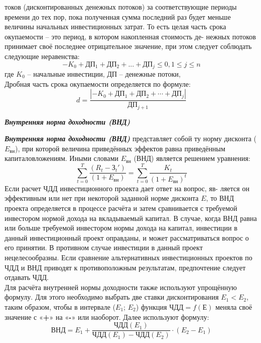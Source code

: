 \documentclass[a4paper,12pt]{article}
\begin{document}
токов (дисконтированных денежных потоков) за соответствующие периоды времени до тех пор, пока полученная сумма последний раз будет
меньше величины начальных инвестиционных затрат. То есть целая часть
срока окупаемости – это период, в котором накопленная стоимость де-
нежных потоков принимает своё последнее отрицательное значение, при
этом следует соблюдать следующие неравенства:
\begin{equation}
− K_0  + ДП_1 + ДП_2  + ... + ДП_j  \le 0 , 1 \le j \le n 
\end{equation}
где $K_0$ – начальные инвестиции, ДП – денежные потоки,\\
Дробная часть срока окупаемости определяется по формуле:
\begin{equation}
	d = \frac{|− K_0 + ДП_1 + ДП_2 + \cdots + ДП_j|}{ДП_{j+1}}
\end{equation}
\begin{center}
	\textbf{\textit{Внутренняя норма доходности (ВНД)}}
\end{center}
\textbf{\textit{Внутренняя норма доходности (ВНД)}} представляет собой ту норму дисконта (${E_{вн}}$), при которой величина приведённых эффектов равна
приведённым капиталовложениям. Иными словами ${E_{вн}}$ (ВНД) является
решением уравнения:
\begin{equation}
	\sum_{t=0}^ T \frac{(R_t - {З_t} \prime)}{(1+E_{вн})} = \sum_{t=0}^ T \frac{K_t}{(1+E_{вн})^t}
\end{equation}
Если расчет ЧДД инвестиционного проекта дает ответ на вопрос, яв-
ляется он эффективным или нет при некоторой заданной норме дисконта
${E}$, то ВНД проекта определяется в процессе расчёта и затем сравнивается
с требуемой инвестором нормой дохода на вкладываемый капитал. В случае, когда ВНД равна или больше требуемой инвестором нормы дохода на
капитал, инвестиции в данный инвестиционный проект оправданы, и может рассматриваться вопрос о его принятии. В противном случае инвестиции в данный проект нецелесообразны. Если сравнение альтернативных
инвестиционных проектов по ЧДД и ВНД приводят к противоположным
результатам, предпочтение следует отдавать ЧДД.\\
Для расчёта внутренней нормы доходности также используют упрощённую формулу. Для этого необходимо выбрать две ставки дисконтирования ${E_1 < E_2}$, таким образом, чтобы в интервале (${E_1}$; ${E_2}$) функция
${ЧДД = f(Е)}$ меняла своё значение с «\textbf{+}» на «\textbf{-}» или наоборот. Далее используют формулу:
\begin{equation}
	ВНД = E_1 + \frac{ЧДД(E_1)}{ЧДД(E_1) - ЧДД(E_2)}\cdot (E_2 - E_1)
\end{equation}
\end{document}
